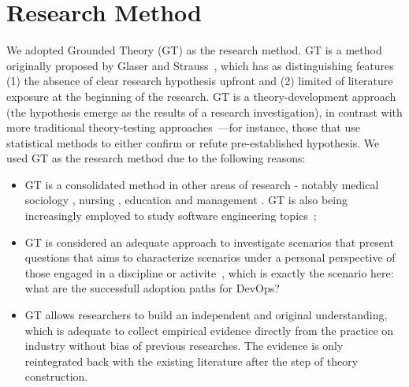 \section{Research Method} \label{sec:research_method}

We adopted Grounded Theory (GT) as the research method. GT is a method
originally proposed by Glaser and Strauss~\cite{glase1967discovery}, which has
as distinguishing features (1) the absence of clear research hypothesis upfront
and (2) limited of literature exposure at the beginning of the research. GT
is a theory-development approach (the hypothesis emerge as the results of
a research investigation), in contrast with more traditional
theory-testing approaches~\cite{coleman2007using}---for instance,  those that
use statistical methods to either confirm or refute pre-established hypothesis.
We used GT as the research method due to the following reasons:


\begin{itemize}

\item GT is a consolidated method in other areas of research - notably medical
sociology \cite{gt_medical_sociology}, nursing \cite{gt_nursing}, education
\cite{gt_education} and management \cite{gt_management}. GT is also being increasingly employed
to study software engineering topics~\cite{hoda2017becoming,stol2016grounded,Waterman:2015:ICSE};

\item GT is considered an adequate approach to investigate scenarios that present
  questions that aims to characterize scenarios under a personal perspective of those
  engaged in a discipline or activite~\cite{barnsteiner2002using},
which is exactly the scenario here: what are the successfull adoption paths for DevOps?

\item GT allows researchers to build an independent and original understanding,
which is adequate to collect empirical evidence directly from the
practice on industry without bias of previous researches. The evidence
is only reintegrated back with the existing literature after the step of
theory construction.

\end{itemize}

